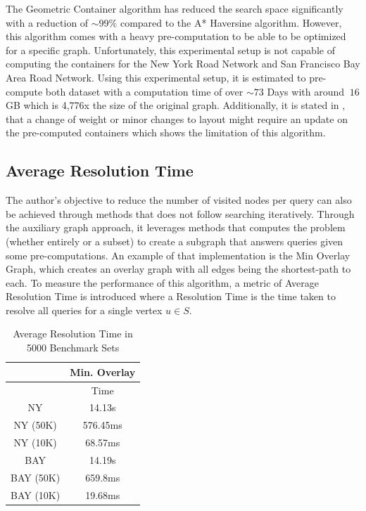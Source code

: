 \documentclass{article}
\begin{document}
The Geometric Container algorithm has reduced the search space significantly with a reduction of $\sim99\%$ compared to the A* Haversine algorithm. However, this algorithm comes with a heavy pre-computation to be able to be optimized for a specific graph. Unfortunately, this experimental setup is not capable of computing the containers for the New York Road Network and San Francisco Bay Area Road Network. Using this experimental setup, it is estimated to pre-compute both dataset with a computation time of over $\sim73$ Days with around $~16$ GB which is 4,776x the size of the original graph. Additionally, it is stated in \cite{Wagner2005}, that a change of weight or minor changes to layout might require an update on the pre-computed containers which shows the limitation of this algorithm.

\subsection{Average Resolution Time}

The author's objective to reduce the number of visited nodes per query can also be achieved through methods that does not follow searching iteratively. Through the auxiliary graph approach, it leverages methods that computes the problem (whether entirely or a subset) to create a subgraph that answers queries given some pre-computations. An example of that implementation is the Min Overlay Graph, which creates an overlay graph with all edges being the shortest-path to each. To measure the performance of this algorithm, a metric of Average Resolution Time is introduced where a Resolution Time is the time taken to resolve all queries for a single vertex $u \in S$.


\begin{table}
    \centering
    \begin{tabular}{cc}
 &Min. Overlay\\
 \hline
         & Time\\
          \hline
         NY& 14.13s\\
         NY (50K)& 576.45ms\\
         NY (10K)& 68.57ms\\
          \hline
         BAY& 14.19s\\
         BAY (50K)& 659.8ms\\
         BAY (10K)& 19.68ms\\
          \hline
    \end{tabular}
    \caption{Average Resolution Time in 5000 Benchmark Sets}
    \label{tab:avgres}
\end{table}
\end{document}
